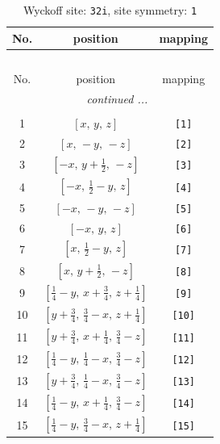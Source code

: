 \documentclass[fleqn,8pt]{jsarticle}
\begin{document}
\renewcommand{\arraystretch}{1.2}
\begin{longtable}{ccc}
\caption{Wyckoff site: {\tt 32i}, site symmetry: {\tt 1}}
 \\
 \hline \hline
No. & position & mapping \\ \hline \endfirsthead

\multicolumn{2}{l}{\tablename\ \thetable{}} \\
 \hline \hline
No. & position & mapping \\ \hline \endhead

 \hline \hline
\multicolumn{2}{r}{\footnotesize\it continued ...} \\ \endfoot

 \hline \hline
\multicolumn{2}{r}{} \\ \endlastfoot

1 & $\left[ x,\, y,\, z \right]$ & {\tt [1]} \\ \hline
2 & $\left[ x,\, - y,\, - z \right]$ & {\tt [2]} \\ \hline
3 & $\left[ - x,\, y + \frac{1}{2},\, - z \right]$ & {\tt [3]} \\ \hline
4 & $\left[ - x,\, \frac{1}{2} - y,\, z \right]$ & {\tt [4]} \\ \hline
5 & $\left[ - x,\, - y,\, - z \right]$ & {\tt [5]} \\ \hline
6 & $\left[ - x,\, y,\, z \right]$ & {\tt [6]} \\ \hline
7 & $\left[ x,\, \frac{1}{2} - y,\, z \right]$ & {\tt [7]} \\ \hline
8 & $\left[ x,\, y + \frac{1}{2},\, - z \right]$ & {\tt [8]} \\ \hline
9 & $\left[ \frac{1}{4} - y,\, x + \frac{3}{4},\, z + \frac{1}{4} \right]$ & {\tt [9]} \\ \hline
10 & $\left[ y + \frac{3}{4},\, \frac{3}{4} - x,\, z + \frac{1}{4} \right]$ & {\tt [10]} \\ \hline
11 & $\left[ y + \frac{3}{4},\, x + \frac{1}{4},\, \frac{3}{4} - z \right]$ & {\tt [11]} \\ \hline
12 & $\left[ \frac{1}{4} - y,\, \frac{1}{4} - x,\, \frac{3}{4} - z \right]$ & {\tt [12]} \\ \hline
13 & $\left[ y + \frac{3}{4},\, \frac{1}{4} - x,\, \frac{3}{4} - z \right]$ & {\tt [13]} \\ \hline
14 & $\left[ \frac{1}{4} - y,\, x + \frac{1}{4},\, \frac{3}{4} - z \right]$ & {\tt [14]} \\ \hline
15 & $\left[ \frac{1}{4} - y,\, \frac{3}{4} - x,\, z + \frac{1}{4} \right]$ & {\tt [15]} \\ \hline

\end{longtable}
\end{document}
